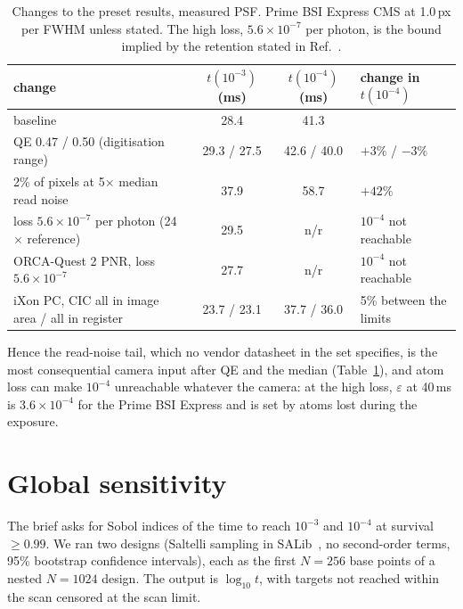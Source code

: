 \documentclass[11pt,a4paper]{article}
\newcommand{\eps}{\varepsilon}
\begin{document}
\begin{table}[htbp]
\centering
\caption{Changes to the preset results, measured PSF. Prime BSI Express CMS at 1.0\,px per FWHM
unless stated. The high loss, $5.6\times10^{-7}$ per photon, is the bound implied by the retention
stated in Ref.~\cite{picken}.}
\label{tab:sensitivity}
\small
\begin{tabular}{@{}l c c l@{}}
\toprule
change & $t(10^{-3})$ (ms) & $t(10^{-4})$ (ms) & change in $t(10^{-4})$ \\
\midrule
baseline & 28.4 & 41.3 & \\
QE 0.47 / 0.50 (digitisation range) & 29.3 / 27.5 & 42.6 / 40.0 & $+3\%$ / $-3\%$ \\
2\% of pixels at 5$\times$ median read noise & 37.9 & 58.7 & $+42\%$ \\
loss $5.6\times10^{-7}$ per photon (24$\times$ reference) & 29.5 & n/r & $10^{-4}$ not reachable \\
ORCA-Quest 2 PNR, loss $5.6\times10^{-7}$ & 27.7 & n/r & $10^{-4}$ not reachable \\
iXon PC, CIC all in image area / all in register & 23.7 / 23.1 & 37.7 / 36.0 & 5\% between the limits \\
\bottomrule
\end{tabular}
\end{table}

Hence the read-noise tail, which no vendor datasheet in the set specifies, is the most consequential
camera input after QE and the median (Table~\ref{tab:sensitivity}), and atom loss can make $10^{-4}$
unreachable whatever the camera: at the high loss, $\eps$ at 40\,ms is $3.6\times10^{-4}$ for the
Prime BSI Express and is set by atoms lost during the exposure.

\section{Global sensitivity}
\label{sec:sobol}

The brief asks for Sobol indices of the time to reach $10^{-3}$ and $10^{-4}$ at survival $\geq 0.99$.
We ran two designs (Saltelli sampling in SALib~\cite{salib}, no second-order terms, 95\% bootstrap
confidence intervals), each as the first $N = 256$ base points of a nested $N = 1024$ design. The
output is $\log_{10} t$, with targets not reached within the scan censored at the scan limit.
\end{document}
